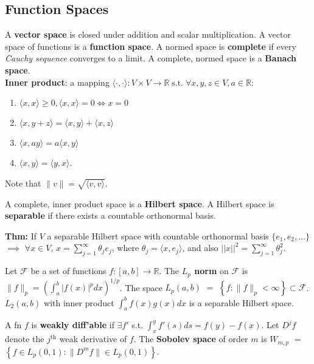 \documentclass[10pt,twocolumn]{article}
\begin{document}
\subsection*{Function Spaces}
    A \textbf{vector space} is closed under addition and scalar multiplication. 
    A vector space of functions is a \textbf{function space}. 
    A normed space is \textbf{complete} if every \emph{Cauchy sequence} converges to a limit. 
    A complete, normed space is a \textbf{Banach space}.\\
    \textbf{Inner product}: a mapping $\langle\cdot,\cdot\rangle: V \times V \rightarrow \mathbb{R} \; \text{s.t.} \; \forall x,y,z \in V, a \in \mathbb{R}:$
    \begin{enumerate}
        \itemsep-.5em
        \item $\langle x,x \rangle \geq 0, \langle x,x \rangle = 0 \Leftrightarrow x = 0$
        \item $\langle x,y+z \rangle  = \langle x,y \rangle + \langle x,z \rangle$
        \item $\langle x, ay \rangle = a\langle x,y \rangle$
        \item $\langle x,y \rangle = \langle y,x \rangle$.
    \end{enumerate}
    \vspace{-3mm}Note that $\|v\| = \sqrt{\langle v,v  \rangle}$.

    A complete, inner product space is a \textbf{Hilbert space}. %
    A Hilbert space is \textbf{separable} if there exists a countable orthonormal basis.

    \textbf{Thm:} If $V$ a separable Hilbert space with countable orthonormal basis 
        $\{ e_1,e_2,\ldots \}$ $\implies$ $\forall x \in V$, $x = \sum_{j=1}^{\infty}\theta_je_j$, 
        where $\theta_j = \langle x, e_j \rangle$, and also $||x||^2 = \sum_{j=1}^{\infty}\theta_j^2$.

    Let $\mathcal{F}$ be a set of functions $f:[a,b] \rightarrow \mathbb{R}$.
    The \textbf{$L_p$ norm} on $\mathcal{F}$ is $\| f \|_p = \left( \int_a^b |f(x)|^p dx  \right)^{1/p}$\hspace{-2mm}. 
    The space $L_p(a,b)$ $=$ $\left\{  f : \| f \|_p < \infty \right\} \subset \mathcal{F}$.
    $L_2(a,b)$ with inner product $\int_a^b f(x)g(x) dx$ is a separable Hilbert space.

    A fn $f$ is \textbf{weakly diff'able} if $\exists f'$ s.t. $\int_x^y f'(s) ds = f(y) - f(x)$.
    Let $D^jf$ denote the $j^{\text{th}}$ weak derivative of $f$.
    The \textbf{Sobolev space} of order $m$ is $W_{m,p}$ $=$ $\left\{ f \in L_p(0,1) : \|D^m f\| \in L_p(0,1) \right\}$.
\end{document}
